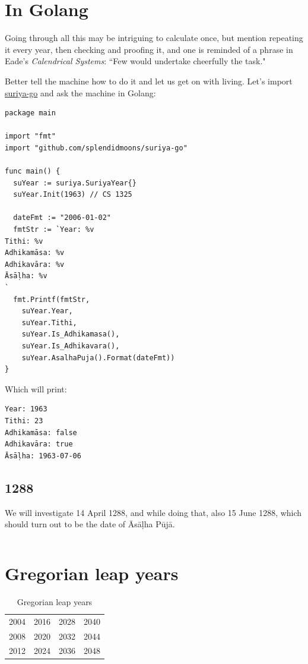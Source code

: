 \documentclass[11pt,oneside]{memoir-article}
\begin{document}
\clearpage

\chapter{In Golang}
\label{sec-6}
\label{suriya-go-example}

Going through all this may be intriguing to calculate once, but mention
repeating it every year, then checking and proofing it, and one is reminded of a
phrase in Eade's \emph{Calendrical Systems}: ``Few would undertake cheerfully the
task."\autocite{eade1995calendrical}

Better tell the machine how to do it and let us get on with living. Let's
import \href{https://github.com/splendidmoons/suriya-go}{suriya-go} and ask the machine in Golang:

\begin{verbatim}
package main

import "fmt"
import "github.com/splendidmoons/suriya-go"

func main() {
  suYear := suriya.SuriyaYear{}
  suYear.Init(1963) // CS 1325

  dateFmt := "2006-01-02"
  fmtStr := `Year: %v
Tithi: %v
Adhikamāsa: %v
Adhikavāra: %v
Āsāḷha: %v
`
  fmt.Printf(fmtStr,
    suYear.Year,
    suYear.Tithi,
    suYear.Is_Adhikamasa(),
    suYear.Is_Adhikavara(),
    suYear.AsalhaPuja().Format(dateFmt))
}
\end{verbatim}

Which will print:

\begin{verbatim}
Year: 1963
Tithi: 23
Adhikamāsa: false
Adhikavāra: true
Āsāḷha: 1963-07-06
\end{verbatim}

\section{1288}
\label{sec-6-1}
\label{golang-1288}

We will investigate 14 April 1288, and while doing that, also 15 June 1288,
which should turn out to be the date of Āsāḷha Pūjā.

\inputminted{go}{./includes/print-1288.go}

\chapter{Gregorian leap years}
\label{sec-7}

\begin{table}[h]
\caption{\label{tbl-cycle-leap-years} Gregorian leap years}
\centering
\begin{tabular}{rrrr}
2004 & 2016 & 2028 & 2040\\
2008 & 2020 & 2032 & 2044\\
2012 & 2024 & 2036 & 2048\\
\end{tabular}
\end{table}
\end{document}
